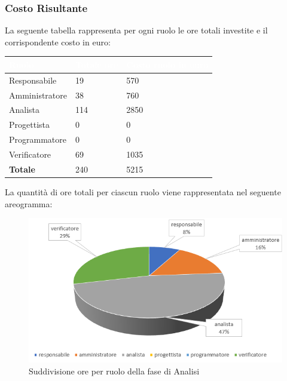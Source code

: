 \clearpage
\subsubsection{Costo Risultante}
La seguente tabella rappresenta per ogni ruolo le ore totali investite e il corrispondente costo in euro:
{
\renewcommand{\arraystretch}{2}
\begin{table}[h]
\centering
\caption{Tabella del costo risultante di Analisi}
\begin{longtable}{ C{3cm} C{2cm} C{4cm}}
	\textcolor{white}{\textbf{Ruolo}} & 
	\textcolor{white}{\textbf{Totale ore}} & 
	\textcolor{white}{\textbf{Costo ruolo in euro}}\\	
\endhead

        Responsabile & 19 & 570\\
        Amministratore & 38 & 760\\
        Analista & 114 & 2850 \\
        Progettista & 0 & 0 \\
        Programmatore & 0 & 0 \\
        Verificatore & 69 & 1035 \\
        \textbf{Totale} & 240 & 5215 \\
		
	\end{longtable}
\end{table}
}


La quantità di ore totali per ciascun ruolo viene rappresentata nel seguente areogramma:
\begin{figure}[h]
\centering
	\caption{Suddivisione ore per ruolo della fase di Analisi}
	
	\includegraphics[scale=2.85]{sezioni/Aerogrammi/AerogrammaAnalisi.png}
\end{figure}
\clearpage

